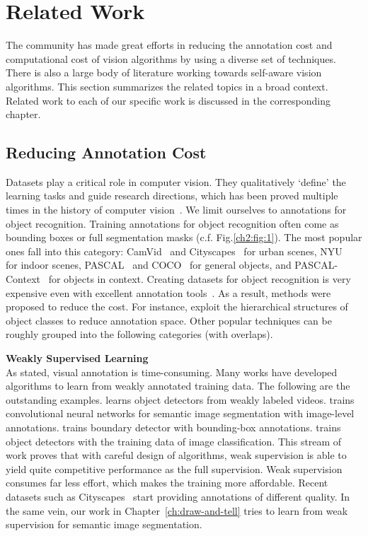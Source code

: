 \chapter{Related Work} 
\label{ch:relatedwork} 

The community has made great efforts in reducing the annotation cost and computational cost of vision algorithms by using a diverse set of techniques. There is also a large body of literature working towards self-aware vision algorithms.  This section summarizes the  related topics in a broad context.  Related work to each of our specific work is discussed in the corresponding chapter.  

\section{Reducing Annotation Cost}

Datasets play a critical role in computer
vision. They qualitatively `define' the learning tasks and guide
research directions, which has been proved multiple times in the history of computer vision~\citep{flow:dataset, pascal:2011, imagenet}.
 We limit ourselves to annotations for object recognition. 
 Training annotations for object recognition often come as bounding boxes or full segmentation masks
(c.f. Fig.\ref{ch2:fig:1}). The most popular ones fall into this
category: CamVid~\citep{camvid:data} and Cityscapes~\citep{cityscapes} for urban scenes,
NYU~\citep{NYU} for indoor scenes, PASCAL~\citep{pascal:2011} and
COCO~\citep{coco:eccv} for general objects, and
PASCAL-Context~\citep{pascal:context} for objects in context.  Creating
datasets for object recognition is very expensive even with excellent annotation
tools~\citep{open:surface, label:me}. As a result, methods were
proposed to reduce the cost.  For instance, \citep{scalable:annotation,
  coco:eccv} exploit the hierarchical structures of object classes to
reduce annotation space. Other popular techniques can be roughly grouped into the following categories (with overlaps).  


\textbf{Weakly Supervised Learning}  \\
As stated, visual annotation is time-consuming.  Many works have developed algorithms to learn from weakly annotated training data. The following are the outstanding examples. \citep{cvpr12:weak:video} learns object detectors from weakly labeled videos. \citep{cnn:mil, cnn:em} trains convolutional neural networks for semantic image segmentation with image-level annotations.   \citep{khoreva16cvpr} trains boundary detector with bounding-box annotations.  \citep{weak:deep:detection} trains object detectors with the training data of image classification. 
This stream of work proves that with careful design of algorithms, weak supervision is able to yield quite competitive performance as the full supervision.  Weak supervision consumes far less effort, which makes the training more affordable. Recent datasets such as Cityscapes~\citep{cityscapes}  start providing annotations of different quality. In the  same vein, our work in Chapter~\ref{ch:draw-and-tell} tries to learn from weak supervision for semantic image segmentation. 
 
